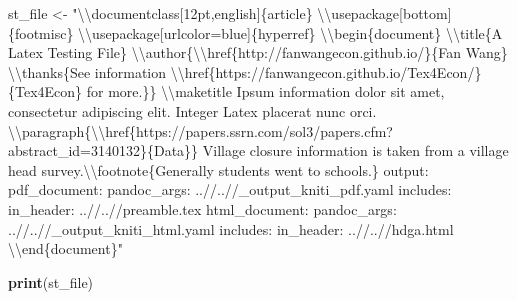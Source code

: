 \documentclass[
]{book}
\newenvironment{Shaded}{\begin{snugshade}}{\end{snugshade}}
\newcommand{\CharTok}[1]{\textcolor[rgb]{0.31,0.60,0.02}{#1}}
\newcommand{\KeywordTok}[1]{\textcolor[rgb]{0.13,0.29,0.53}{\textbf{#1}}}
\newcommand{\NormalTok}[1]{#1}
\newcommand{\StringTok}[1]{\textcolor[rgb]{0.31,0.60,0.02}{#1}}
\begin{document}
\begin{Shaded}
\begin{Highlighting}[]
\NormalTok{st\_file \textless{}{-}}\StringTok{ "}\CharTok{\textbackslash{}\textbackslash{}}\StringTok{documentclass[12pt,english]\{article\}}
\CharTok{\textbackslash{}\textbackslash{}}\StringTok{usepackage[bottom]\{footmisc\}}
\CharTok{\textbackslash{}\textbackslash{}}\StringTok{usepackage[urlcolor=blue]\{hyperref\}}
\CharTok{\textbackslash{}\textbackslash{}}\StringTok{begin\{document\}}
\CharTok{\textbackslash{}\textbackslash{}}\StringTok{title\{A Latex Testing File\}}
\CharTok{\textbackslash{}\textbackslash{}}\StringTok{author\{}\CharTok{\textbackslash{}\textbackslash{}}\StringTok{href\{http://fanwangecon.github.io/\}\{Fan Wang\} }\CharTok{\textbackslash{}\textbackslash{}}\StringTok{thanks\{See information }\CharTok{\textbackslash{}\textbackslash{}}\StringTok{href\{https://fanwangecon.github.io/Tex4Econ/\}\{Tex4Econ\} for more.\}\}}
\CharTok{\textbackslash{}\textbackslash{}}\StringTok{maketitle}
\StringTok{Ipsum information dolor sit amet, consectetur adipiscing elit. Integer Latex placerat nunc orci.}
\CharTok{\textbackslash{}\textbackslash{}}\StringTok{paragraph\{}\CharTok{\textbackslash{}\textbackslash{}}\StringTok{href\{https://papers.ssrn.com/sol3/papers.cfm?abstract\_id=3140132\}\{Data\}\}}
\StringTok{Village closure information is taken from a village head survey.}\CharTok{\textbackslash{}\textbackslash{}}\StringTok{footnote\{Generally students went to schools.\}}
\StringTok{output:}
\StringTok{  pdf\_document:}
\StringTok{    pandoc\_args: \textquotesingle{}..//..//\_output\_kniti\_pdf.yaml\textquotesingle{}}
\StringTok{    includes:}
\StringTok{      in\_header: \textquotesingle{}..//..//preamble.tex\textquotesingle{}}
\StringTok{  html\_document:}
\StringTok{    pandoc\_args: \textquotesingle{}..//..//\_output\_kniti\_html.yaml\textquotesingle{}}
\StringTok{    includes:}
\StringTok{      in\_header: \textquotesingle{}..//..//hdga.html\textquotesingle{}}
\CharTok{\textbackslash{}\textbackslash{}}\StringTok{end\{document\}"}

\KeywordTok{print}\NormalTok{(st\_file)}
\end{Highlighting}
\end{Shaded}
\end{document}
